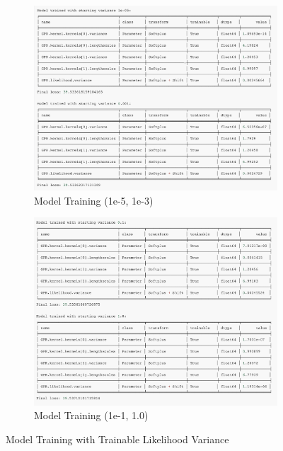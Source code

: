 \begin{figure}[htbp]
    \centering
    \begin{subfigure}[b]{0.48\textwidth}
        \centering
        \includegraphics[width=\textwidth]{figures/model_training.jpg}
        \caption{Model Training (1e-5, 1e-3)}
        \label{fig:model_training1}
    \end{subfigure}
    \hfill
    \begin{subfigure}[b]{0.48\textwidth}
        \centering
        \includegraphics[width=\textwidth]{figures/model_train2.jpg}
        \caption{Model Training (1e-1, 1.0)}
        \label{fig:model_training2}
    \end{subfigure}
    \caption{Model Training with Trainable Likelihood Variance}
    \label{fig:model_training}
\end{figure}


